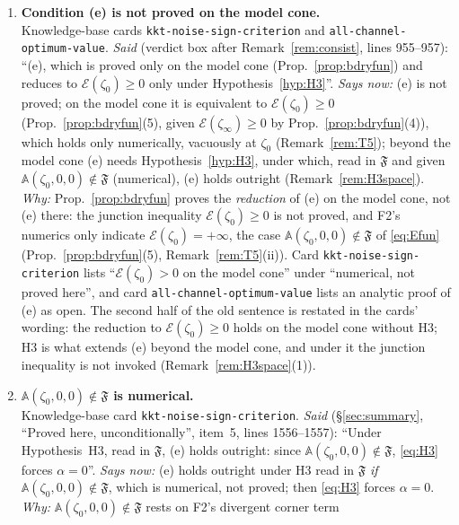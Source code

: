 \documentclass[11pt]{article}
\newcommand{\Aop}{\mathbb A}
\begin{document}
\begin{enumerate}[label=C\arabic*,ref=C\arabic*,leftmargin=2.4em,itemsep=3pt]
 proved $\mathcal E(\zeta_\infty)\ge0$ alone).
\item\label{corr0924:C3} \textbf{Condition (e) is not proved on the model cone.}\\
 Knowledge-base cards \texttt{kkt-noise-sign-criterion} and \texttt{all-channel-optimum-value}.
 \emph{Said} (verdict box after Remark~\ref{rem:consist}, lines 955--957): ``(e), which is
 proved only on the model cone (Prop.~\ref{prop:bdryfun}) and reduces to
 $\mathcal E(\zeta_0)\ge0$ only under Hypothesis~\ref{hyp:H3}''.
 \emph{Says now:} (e) is not proved; on the model cone it is equivalent to
 $\mathcal E(\zeta_0)\ge0$ (Prop.~\ref{prop:bdryfun}(5), given $\mathcal E(\zeta_\infty)\ge0$
 by Prop.~\ref{prop:bdryfun}(4)), which holds only numerically, vacuously at $\zeta_0$
 (Remark~\ref{rem:T5}); beyond the model cone (e) needs Hypothesis~\ref{hyp:H3}, under which,
 read in $\mathfrak F$ and given $\Aop(\zeta_0,0,0)\notin\mathfrak F$ (numerical), (e) holds
 outright (Remark~\ref{rem:H3space}).
 \emph{Why:} Prop.~\ref{prop:bdryfun} proves the \emph{reduction} of (e) on the model cone,
 not (e) there: the junction inequality $\mathcal E(\zeta_0)\ge0$ is not proved, and F2's
 numerics only indicate $\mathcal E(\zeta_0)=+\infty$, the case
 $\Aop(\zeta_0,0,0)\notin\mathfrak F$ of \eqref{eq:Efun} (Prop.~\ref{prop:bdryfun}(5),
 Remark~\ref{rem:T5}(ii)).  Card \texttt{kkt-noise-sign-criterion} lists
 ``$\mathcal E(\zeta_0)>0$ on the model cone'' under ``numerical, not proved here'', and card
 \texttt{all-channel-optimum-value} lists an analytic proof of (e) as open.  The second half
 of the old sentence is restated in the cards' wording: the reduction to
 $\mathcal E(\zeta_0)\ge0$ holds on the model cone without H3; H3 is what extends (e) beyond
 the model cone, and under it the junction inequality is not invoked
 (Remark~\ref{rem:H3space}(1)).
\item\label{corr0924:C4} \textbf{$\Aop(\zeta_0,0,0)\notin\mathfrak F$ is numerical.}\\
 Knowledge-base card \texttt{kkt-noise-sign-criterion}.
 \emph{Said} (\S\ref{sec:summary}, ``Proved here, unconditionally'', item~5, lines
 1556--1557): ``Under Hypothesis~H3, read in $\mathfrak F$, (e) holds outright: since
 $\Aop(\zeta_0,0,0)\notin\mathfrak F$, \eqref{eq:H3} forces $\alpha=0$''.
 \emph{Says now:} (e) holds outright under H3 read in $\mathfrak F$ \emph{if}
 $\Aop(\zeta_0,0,0)\notin\mathfrak F$, which is numerical, not proved; then \eqref{eq:H3}
 forces $\alpha=0$.
 \emph{Why:} $\Aop(\zeta_0,0,0)\notin\mathfrak F$ rests on F2's divergent corner term

\end{enumerate}
\end{document}
